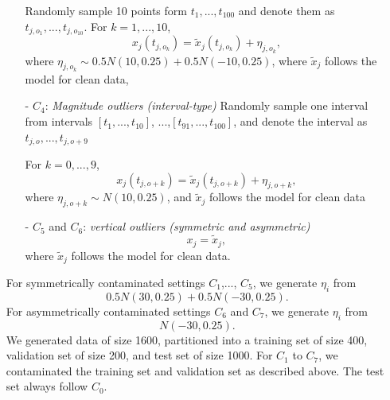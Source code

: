 \documentclass{article}
\begin{document}
\begin{itemize}
\begin{itemize}
       \vspace{1ex}
   Randomly sample 10  points form $t_1,..., t_{100}$ and denote them as $t_{j,o_1},..., t_{j,o_{10}}$. For $k = 1,..., 10$,   
    $$x_{j}(t_{j,o_k}) = \tilde{x}_j(t_{j,o_k}) + \eta_{j,o_k},$$ where $\eta_{j,o_k} \sim 0.5 N(10, 0.25) + 0.5 N(-10, 0.25)$, where
 $\tilde{x}_j$ follows the model for clean data,
    \vspace{1ex}
    \item[- ] $C_4$: \textit{Magnitude outliers (interval-type)}
\vspace{1ex}
     Randomly sample one interval from intervals $[t_1,...,t_{10}]$, ...,$[t_{91},...,t_{100}]$,   and denote the interval as $t_{j,o},..., t_{j,o+9}$
     
     For $k = 0,..., 9$,   
    $$x_{j}(t_{j,o + k}) = \tilde{x}_j(t_{j,o + k}) + \eta_{j,o+k},$$ where $\eta_{j,o + k} \sim  N(10, 0.25)$, and 
 $\tilde{x}_j$ follows the model for clean data
    \vspace{1ex}
 
    \item[- ] $C_5$ and $C_6$: \textit{vertical outliers (symmetric and asymmetric)} 
       \vspace{1ex}
   $$ x_j = \tilde{x}_j,$$
   where $\tilde{x}_j$ follows the model for clean data. 
\end{itemize}
For symmetrically contaminated settings $C_1$,..., $C_5$, we generate $\eta_i$ from $$ 0.5N(30,0.25) + 0.5N(-30,0.25).$$
For asymmetrically contaminated settings $C_6$ and $C_7$,  we generate $\eta_i$ from $$N(-30,0.25).$$
We generated data of size 1600, partitioned into a training set of size 400, validation set of size 200, and test set of size 1000. For $C_1$ to $C_7$, we contaminated the  training set and validation set as described above.  The test set always follow $C_0$. 
\end{itemize}
\end{document}
